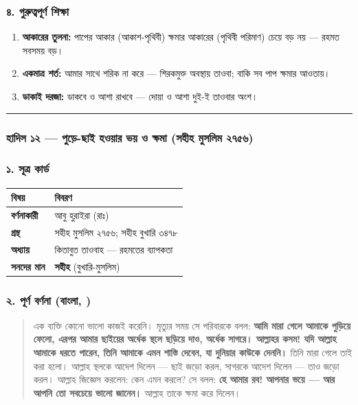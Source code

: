 \subsubsection*{৪. গুরুত্বপূর্ণ শিক্ষা}

\begin{enumerate}
\item \textbf{আকারের তুলনা:} পাপের আকার (আকাশ-পৃথিবী) ক্ষমার আকারের (পৃথিবী পরিমাণ) চেয়ে বড় নয় — রহমত সবসময় বড়।
\item \textbf{একমাত্র শর্ত:} আমার সাথে শরিক না করে — শিরকমুক্ত অবস্থায় তাওবা; বাকি সব পাপ ক্ষমার আওতায়।
\item \textbf{ডাকাই দরজা:} ডাকবে ও আশা রাখবে — দোয়া ও আশা দুই-ই তাওবার অংশ।
\end{enumerate}
\medskip\hrule\medskip

\subsubsection*{হাদিস ১২ — পুড়ে-ছাই হওয়ার ভয় ও ক্ষমা (সহীহ মুসলিম ২৭৫৬)}

\subsubsection*{১. সূত্র কার্ড}

\begin{table}[h]\centering\small
\begin{tabular}{ll}
বিষয় & বিবরণ \\
\hline
\textbf{বর্ণনাকারী} & আবু হুরাইরা (রাঃ) \\
\textbf{গ্রন্থ} & সহীহ মুসলিম ২৭৫৬; সহীহ বুখারি ৩৪৭৮ \\
\textbf{অধ্যায়} & কিতাবুত তাওবাহ — রহমতের ব্যাপকতা \\
\textbf{সনদের মান} & \textbf{সহীহ} (বুখারি-মুসলিম) \\
\hline
\end{tabular}
\end{table}

\subsubsection*{২. পূর্ণ বর্ণনা (বাংলা, )}

\begin{quote}
এক ব্যক্তি কোনো ভালো কাজই করেনি। মৃত্যুর সময় সে পরিবারকে বলল: \textbf{আমি মারা গেলে আমাকে পুড়িয়ে ফেলো, এরপর আমার ছাইয়ের অর্ধেক স্থলে ছড়িয়ে দাও, অর্ধেক সাগরে। আল্লাহর কসম! যদি আল্লাহ আমাকে ধরতে পারেন, তিনি আমাকে এমন শাস্তি দেবেন, যা দুনিয়ার কাউকে দেননি।} তিনি মারা গেলে তাই করা হলো। আল্লাহ স্থলকে আদেশ দিলেন — ছাই জড়ো করল, সাগরকে আদেশ দিলেন — তাও জড়ো করল। আল্লাহ জিজ্ঞেস করলেন: কেন এমন করলে? সে বলল: \textbf{হে আমার রব! আপনার ভয়ে — আর আপনি তো সবচেয়ে ভালো জানেন।} আল্লাহ তাকে ক্ষমা করে দিলেন।
\end{quote}

